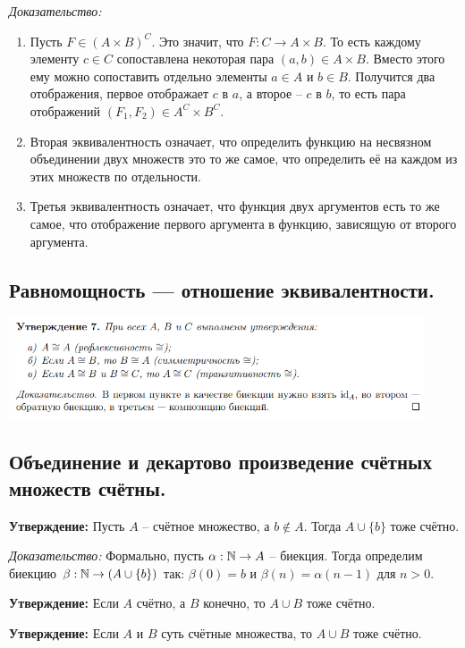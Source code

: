 \textit{Доказательство:} 
\begin{enumerate}
    \item Пусть $F \in (A \times B)^C$. Это значит, что $F : C \to A \times B$. То есть каждому элементу $c \in C$ сопоставлена некоторая пара $(a, b) \in A \times B$. Вместо этого ему можно сопоставить отдельно элементы $a \in A$ и $b \in B$. Получится два отображения, первое отображает $c$ в $a$, а второе -- $c$ в $b$, то есть пара отображений $(F_1, F_2) \in A^C \times B^C$.
    \item Вторая эквивалентность означает, что определить функцию на несвязном объединении двух множеств это то же самое, что определить её на каждом из этих множеств по отдельности.
    \item Третья эквивалентность означает, что функция двух аргументов есть то же самое, что отображение первого аргумента в функцию, зависящую от второго аргумента.
\end{enumerate}

\subsection{Равномощность — отношение эквивалентности.}

\includegraphics[width = 0.92\textwidth]{images/equiv_sets.png}

\subsection{Объединение и декартово произведение счётных множеств счётны.}

\textbf{Утверждение:} Пусть $A$ -- счётное множество, а $b \not\in A$. Тогда $A \cup \{b\}$ тоже счётно.

\textit{Доказательство:} Формально, пусть $\alpha: \mathbb{N} \to A$ -- биекция. Тогда определим биекцию $\beta: \mathbb{N} \to (A \cup \{b\})$ так: $\beta(0) = b$ и $\beta(n) = \alpha(n - 1)$ для $n > 0$.

\textbf{Утверждение:} Если $A$ счётно, а $B$ конечно, то $A \cup B$ тоже счётно.

\textbf{Утверждение:} Если $A$ и $B$ суть счётные множества, то $A \cup B$ тоже счётно.

